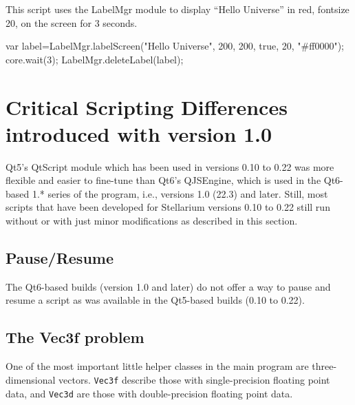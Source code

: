 \noindent This script uses the LabelMgr module to display ``Hello Universe'' in red, fontsize 20, on the screen for 3 seconds.
\begin{script}
var label=LabelMgr.labelScreen("Hello Universe", 200, 200, 
                               true, 20, "#ff0000");
core.wait(3);
LabelMgr.deleteLabel(label);
\end{script}

\section{Critical Scripting Differences introduced with version 1.0}
\label{sec:scripting:differences}

Qt5's QtScript module which has been used in versions 0.10 to 0.22 was more flexible and easier to fine-tune than Qt6's QJSEngine, 
which is used in the Qt6-based 1.* series of the program, i.e., versions 1.0 (22.3) and later. 
Still, most scripts that have been developed for Stellarium versions 0.10 to 0.22 
still run without or with just minor modifications as described in this section. 

\subsection{Pause/Resume}
\label{sec:scripting:differences:pause}

The Qt6-based builds (version 1.0 and later) do not offer a way to pause and resume a script as was available in the Qt5-based builds (0.10 to 0.22). 

\subsection{The Vec3f problem}
\label{sec:scripting:differences:Vec3f}

One of the most important little helper classes in the main program are three-dimensional vectors. 
\texttt{Vec3f} describe those with single-precision floating point data, 
and \texttt{Vec3d} are those with double-precision floating point data.

